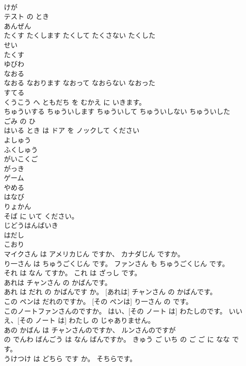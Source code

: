 \documentclass[8pt]{extreport}
\begin{document}
\begin{CJK}{UTF8}{min}
\\	けが	
\\	テスト の とき	
\\	あんぜん	
\\	たくす	たくします	たくして	たくさない	たくした	
\\	せい	
\\	たくす	
\\	ゆびわ	
\\	なおる	
\\	なおる	なおります	なおって	なおらない	なおった	
\\	すてる	
\\	くうこう へ ともだち を むかえ に いきます。	
\\	ちゅういする	ちゅういします	ちゅういして	ちゅういしない	ちゅういした	
\\	ごみ の ひ	
\\	はいる とき は ドア を ノックして ください	
\\	よしゅう	
\\	ふくしゅう	
\\	がいこくご	
\\	がっき	
\\	ゲーム	
\\	やめる	
\\	はなび	
\\	りょかん	
\\	そば に いて ください。	
\\	じどうはんばいき	
\\	はだし	
\\	こおり	
\\	マイクさん は アメリカじん ですか、 カナダじん ですか。	
\\	り一さん は ちゅうごくじん です。 ファンさん も ちゅうごくじん です。	
\\	それ は なん てすか。 これ は ざっし です。	
\\	あれは チャンさん の かばんです。	
\\	あれ は だれ の かばんです か。 [あれは] チャンさん の かばんです。	
\\	この ペンは だれのですか。 [その ぺンは] り一さん の です。	
\\	このノートファンさんのですか。 はい、[その ノート は] わたしのです。 いいえ、[その ノート は] わたし の じゃありません。	
\\	あの かばん は チャンさんのですか、 ルンさんのですが	
\\	の でんわ ばんごう は なん ばんですか。 きゅう ご いち の ご ご に なな です。	
\\	うけつけ は どちら です か。 そちらです。	

\end{CJK}
\end{document}
